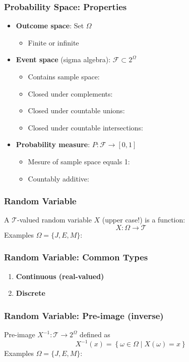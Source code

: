 \documentclass{beamer}
\begin{document}
\begin{frame} \frametitle{Probability Space: Properties}
\begin{itemize}
\item \textbf{Outcome space}: Set $\Omega$
  \begin{itemize}
  \item Finite or infinite
  \end{itemize}
\item \textbf{Event space} (sigma algebra): $\mathcal{F} \subset 2^{\Omega}$
  \begin{itemize}
  \item Contains sample space:
  \item Closed under complements:
  \item Closed under countable unions:
  \item Closed under countable intersections:
  \end{itemize}
  \vfill 
\item \textbf{Probability measure}: $P \colon \mathcal{F} \to [0,1]$
  \begin{itemize}
  \item Mesure of sample space equals 1:
  \item Countably additive:
  \end{itemize}
  \vfill 
\end{itemize}
\end{frame}

\begin{frame} \frametitle{Random Variable}
  A $\mathcal{T}$-valued random variable $X$ (upper case!) is a function:
  \[ X \colon \Omega \to \mathcal{T}\]
    Examples \( \Omega = \{ J, E, M \} \):
    \vspace{4cm}
\end{frame}


\begin{frame} \frametitle{Random Variable: Common Types}
  \begin{enumerate}
  \item \textbf{Continuous (real-valued)}
   \vfill  
 \item \textbf{Discrete}
   \vfill 
  \end{enumerate}
\end{frame}

\begin{frame} \frametitle{Random Variable: Pre-image (inverse)}
  Pre-image \( X^{-1} \colon \mathcal{T} \to 2^{\Omega}  \) defined as
  \[
    X^{-1}(x) = \left\{ \omega \in \Omega \mid X(\omega) = x \right\} 
  \]
  Examples \( \Omega = \{ J, E, M \} \):
  \vspace{4cm} 
\end{frame}
\end{document}
